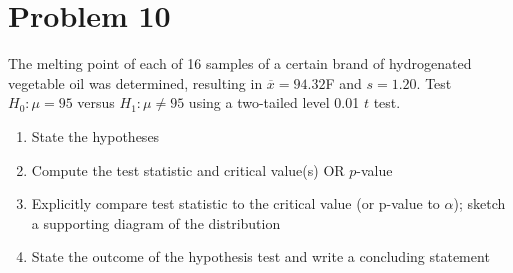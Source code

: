 \documentclass[11pt,twoside]{article}
\newcommand{\pts}[1]{\marginpar{ \small\hspace{0pt} \textit{[#1]} } }
\numberwithin{equation}{section}
\newcommand{\?}{\stackrel{?}{=}}
\newcommand{\ol}{\overline}
\begin{document}
\section*{Problem 10       }
The melting point of each of 16 samples of a certain brand of hydrogenated vegetable oil was determined, resulting in $\ol{x} = 94.32$F and $s = 1.20$.
Test $H_0: \mu = 95$ versus $H_1: \mu \ne 95$ using a two-tailed level 0.01 $t$ test.
  \begin{enumerate}[\bf (a)]
    \item  State the hypotheses \pts{2}
  \vspace{10ex}
  \item Compute the test statistic and critical value(s) OR $p$-value \pts{3}
  \vspace{35ex}
  \item Explicitly compare test statistic to the critical value (or p-value to $\alpha$); sketch a supporting diagram of the distribution \pts{3}
  \vspace{40ex}
  \item State the outcome of the hypothesis test and write a concluding statement \pts{2}
  \end{enumerate}
 


\end{document}
